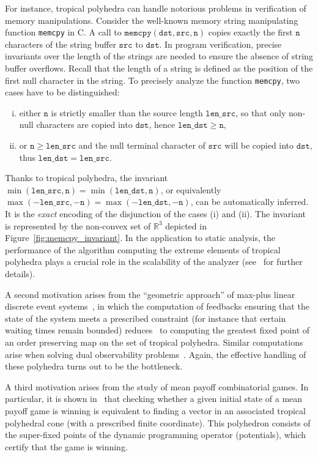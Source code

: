 \documentclass[proceedings]{stacs}
\begin{document}
For instance, tropical polyhedra can handle notorious problems in verification of memory manipulations. Consider the well-known memory string manipulating function \texttt{memcpy} in C. A call to $\mathtt{memcpy(dst,src,n)}$ copies exactly the first $\mathtt{n}$ characters of the string buffer $\mathtt{src}$ to $\mathtt{dst}$. In program verification, precise invariants over the length of the strings are needed to ensure the absence of string buffer overflows. Recall that the length of a string is defined as the position of the first null character in the string. To precisely analyze the function \texttt{memcpy}, two cases have to be distinguished: 
\begin{enumerate}[(i)]
\item either $\mathtt{n}$ is strictly smaller than the source length $\mathtt{len\_src}$, so that only non-null characters are copied into $\mathtt{dst}$, hence $\mathtt{len\_dst} \geq \mathtt{n}$,
\item or $\mathtt{n} \geq \mathtt{len\_src}$ and the null terminal character of $\mathtt{src}$ will be copied into $\mathtt{dst}$, thus $\mathtt{len\_dst} = \mathtt{len\_src}$.
\end{enumerate}
Thanks to tropical polyhedra, the invariant $\min(\mathtt{len\_src},\mathtt{n}) = \min(\mathtt{len\_dst},\mathtt{n})$, or equivalently $\max(-\mathtt{len\_src},-\mathtt{n}) = \max(-\mathtt{len\_dst},-\mathtt{n})$, can be automatically inferred. It is the \emph{exact} encoding of the disjunction of the cases (i) and (ii). The invariant is represented by the non-convex set of $\mathbb{R}^3$ depicted in Figure~\ref{fig:memcpy_invariant}.
In the application to static analysis, the performance of the algorithm computing the extreme elements of tropical polyhedra plays a crucial role in the scalability of the analyzer (see~\cite{AGG08} for further details).


A second motivation arises from the ``geometric approach'' of max-plus linear
discrete event systems~\cite{ccggq99}, in which the computation of feedbacks
ensuring that the state of the system meets a prescribed
constraint (for instance that certain waiting times remain bounded)
reduces~\cite{katz05} to computing the greatest fixed
point of an order preserving map on the set of tropical
polyhedra. Similar computations arise when solving
dual observability problems~\cite{loiseau}.
Again, the effective handling of these polyhedra turns
out to be the bottleneck.

A third motivation arises from the study of mean payoff
combinatorial games. In particular, it is shown in~\cite{AGGut09}
that checking whether a given initial state of a mean payoff game is
winning is equivalent to finding a vector in an associated
tropical polyhedral cone (with a prescribed finite coordinate).
This polyhedron consists
of the super-fixed points of the dynamic programming operator
(potentials), which certify that the game is winning.
\end{document}
